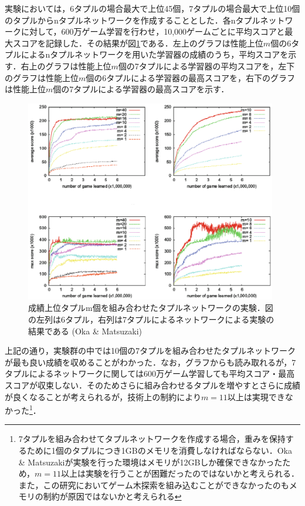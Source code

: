 \documentclass{suribt}
\begin{document}
実験においては，6タプルの場合最大で上位45個，7タプルの場合最大で上位10個のタプルからnタプルネットワークを作成することとした．各nタプルネットワークに対して，600万ゲーム学習を行わせ，10,000ゲームごとに平均スコアと最大スコアを記録した．その結果が図\ref{figure_005}である．左上のグラフは性能上位$m$個の6タプルによるnタプルネットワークを用いた学習器の成績のうち，平均スコアを示す．右上のグラフは性能上位$m$個の7タプルによる学習器の平均スコアを，左下のグラフは性能上位$m$個の6タプルによる学習器の最高スコアを，右下のグラフは性能上位$m$個の7タプルによる学習器の最高スコアを示す．

\begin{figure}[t]
	\begin{center}
	\includegraphics[width=11cm]{figure_005.eps}
	\caption{成績上位タプルm個を組み合わせたタプルネットワークの実験．図の左列は6タプル，右列は7タプルによるネットワークによる実験の結果である (Oka \& Matsuzaki)}
	\label{figure_005}
	\end{center}
\end{figure}

上記の通り，実験群の中では10個の7タプルを組み合わせたタプルネットワークが最も良い成績を収めることがわかった．なお，グラフからも読み取れるが，7タプルによるネットワークに関しては600万ゲーム学習しても平均スコア・最高スコアが収束しない．そのためさらに組み合わせるタプルを増やすとさらに成績が良くなることが考えられるが，技術上の制約により$m=11$以上は実現できなかった\footnote{7タプルを組み合わせてタプルネットワークを作成する場合，重みを保持するために1個のタプルにつき1GBのメモリを消費しなければならない．Oka \& Matsuzakiが実験を行った環境はメモリが12GBしか確保できなかったため，$m=11$以上は実験を行うことが困難だったのではないかと考えられる．また，この研究においてゲーム木探索を組み込むことができなかったのもメモリの制約が原因ではないかと考えられる}．
\end{document}
